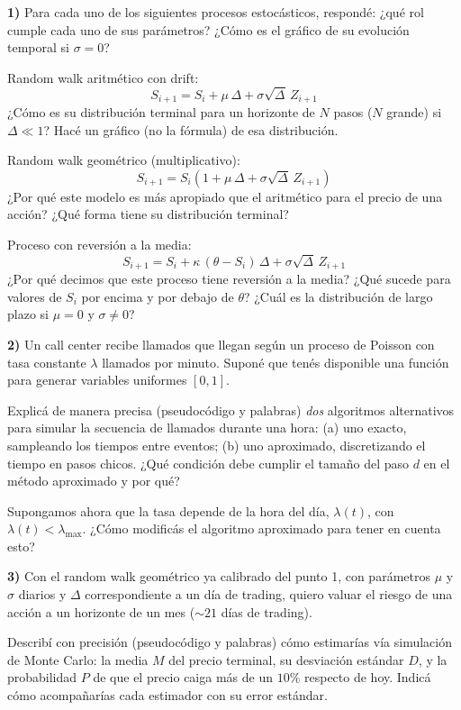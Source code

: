 \documentclass[11pt]{article}
\begin{document}

\noindent\textbf{1)} Para cada uno de los siguientes procesos estocásticos, respondé: ¿qué rol cumple cada uno de sus parámetros? ¿Cómo es el gráfico de su evolución temporal si $\sigma = 0$?

\medskip
{} Random walk aritmético con drift:
\[
S_{i+1} = S_i + \mu\,\Delta + \sigma\sqrt{\Delta}\,Z_{i+1}
\]
¿Cómo es su distribución terminal para un horizonte de $N$ pasos ($N$ grande) si $\Delta \ll 1$? Hacé un gráfico (no la fórmula) de esa distribución.

\espacio{4.5cm}

 Random walk geométrico (multiplicativo):
\[
S_{i+1} = S_i\left(1 + \mu\,\Delta + \sigma\sqrt{\Delta}\,Z_{i+1}\right)
\]
¿Por qué este modelo es más apropiado que el aritmético para el precio de una acción? ¿Qué forma tiene su distribución terminal?

\espacio{4.5cm}

 Proceso con reversión a la media:
\[
S_{i+1} = S_i + \kappa\,(\theta - S_i)\,\Delta + \sigma\sqrt{\Delta}\,Z_{i+1}
\]
¿Por qué decimos que este proceso tiene reversión a la media? ¿Qué sucede para valores de $S_i$ por encima y por debajo de $\theta$? ¿Cuál es la distribución de largo plazo si $\mu = 0$ y $\sigma \neq 0$?

\espacio{4.5cm}

\noindent\textbf{2)} Un call center recibe llamados que llegan según un proceso de Poisson con tasa constante $\lambda$ llamados por minuto. Suponé que tenés disponible una función para generar variables uniformes $[0,1]$.

\medskip
{} Explicá de manera precisa (pseudocódigo y palabras) \emph{dos} algoritmos alternativos para simular la secuencia de llamados durante una hora: (a) uno exacto, sampleando los tiempos entre eventos; (b) uno aproximado, discretizando el tiempo en pasos chicos. ¿Qué condición debe cumplir el tamaño del paso $d$ en el método aproximado y por qué?

\espacio{6.5cm}

 Supongamos ahora que la tasa depende de la hora del día, $\lambda(t)$, con $\lambda(t) < \lambda_{\max}$. ¿Cómo modificás el algoritmo aproximado para tener en cuenta esto?

\espacio{4cm}

\noindent\textbf{3)} Con el random walk geométrico ya calibrado del punto 1, con parámetros $\mu$ y $\sigma$ diarios y $\Delta$ correspondiente a un día de trading, quiero valuar el riesgo de una acción a un horizonte de un mes ($\sim 21$ días de trading).

\medskip
{} Describí con precisión (pseudocódigo y palabras) cómo estimarías vía simulación de Monte Carlo: la media $M$ del precio terminal, su desviación estándar $D$, y la probabilidad $P$ de que el precio caiga más de un $10\%$ respecto de hoy. Indicá cómo acompañarías cada estimador con su error estándar.

\espacio{7cm}
\end{document}
